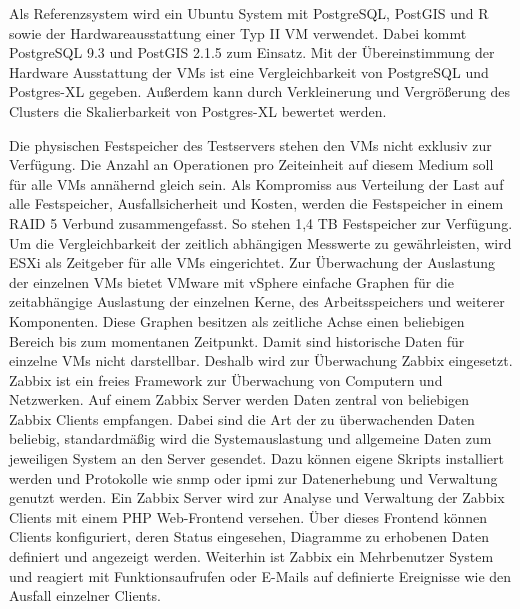 Als Referenzsystem wird ein Ubuntu System mit PostgreSQL, PostGIS und R sowie der Hardwareausstattung einer Typ II VM verwendet.
Dabei kommt PostgreSQL 9.3 und PostGIS 2.1.5 zum Einsatz.
Mit der Übereinstimmung der Hardware Ausstattung der VMs ist eine Vergleichbarkeit von PostgreSQL und Postgres-XL gegeben.
Außerdem kann durch Verkleinerung und Vergrößerung des Clusters die Skalierbarkeit von Postgres-XL bewertet werden.

Die physischen Festspeicher des Testservers stehen den VMs nicht exklusiv zur Verfügung.
Die Anzahl an Operationen pro Zeiteinheit auf diesem Medium soll für alle VMs annähernd gleich sein.
Als Kompromiss aus Verteilung der Last auf alle Festspeicher, Ausfallsicherheit und Kosten, werden die Festspeicher in einem RAID 5 Verbund zusammengefasst.
So stehen 1,4 TB Festspeicher zur Verfügung.
Um die Vergleichbarkeit der zeitlich abhängigen Messwerte zu gewährleisten, wird ESXi als Zeitgeber für alle VMs eingerichtet.
Zur Überwachung der Auslastung der einzelnen VMs bietet VMware mit vSphere einfache Graphen für die zeitabhängige Auslastung der einzelnen Kerne, des Arbeitsspeichers und weiterer Komponenten.
Diese Graphen besitzen als zeitliche Achse einen beliebigen Bereich bis zum momentanen Zeitpunkt.
Damit sind historische Daten für einzelne VMs nicht darstellbar.
Deshalb wird zur Überwachung Zabbix eingesetzt.
Zabbix ist ein freies Framework zur Überwachung von Computern und Netzwerken.
Auf einem Zabbix Server werden Daten zentral von beliebigen Zabbix Clients empfangen.
Dabei sind die Art der zu überwachenden Daten beliebig, standardmäßig wird die Systemauslastung und allgemeine Daten zum jeweiligen System an den Server gesendet.
Dazu können eigene Skripts installiert werden und Protokolle wie \Gls{snmp} oder \Gls{ipmi} zur Datenerhebung und Verwaltung genutzt werden.
Ein Zabbix Server wird zur Analyse und Verwaltung der Zabbix Clients mit einem PHP Web-Frontend versehen.
Über dieses Frontend können Clients konfiguriert, deren Status eingesehen, Diagramme zu erhobenen Daten definiert und angezeigt werden.
Weiterhin ist Zabbix ein Mehrbenutzer System und reagiert mit Funktionsaufrufen oder E-Mails auf definierte Ereignisse wie den Ausfall einzelner Clients.


